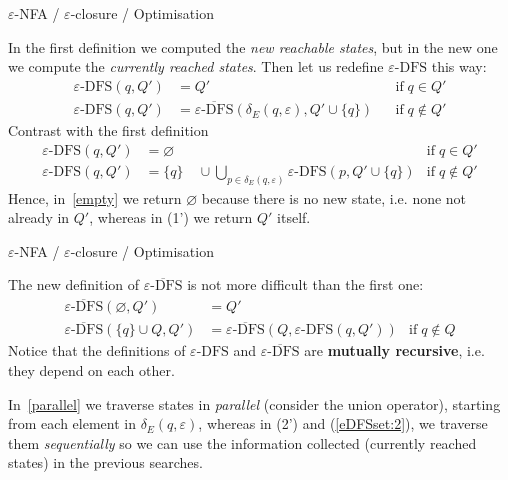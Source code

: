 \documentclass[compress,dvips,xcolor={dvipsnames},t]{beamer}
\newcommand\eNFA{\(\varepsilon\)-NFA\xspace}
\newcommand\eDFS{\varepsilon\text{-DFS}}
\newcommand\eDFSset{\overline{\varepsilon\text{-DFS}}}
\begin{document}
%
\begin{frame}{\eNFA{} / \(\varepsilon\)-closure / Optimisation}

In the first definition we computed the \emph{new reachable states},
but in the new one we compute the \emph{currently reached
  states}. Then let us redefine \(\eDFS\) this way:
\begin{align*}
  \eDFS (q, Q')
&= Q'
&& \text{if} \; q \in Q' \tag{1'}\\
  \eDFS (q, Q')
&= \eDFSset (\delta_E (q, \varepsilon), Q' \cup \{q\})
&& \text{if} \; q \not\in Q' \tag{2'}
\end{align*}
Contrast with the first definition
\begin{align*}
   \eDFS (q, Q')
&= \varnothing
& \text{if} \; q \in Q' \tag{1} \label{empty}\\
  \eDFS (q, Q')
&= \{q\} \quad \cup \bigcup_{p \in \delta_E(q,\varepsilon)}{\eDFS (p, Q'
    \cup \{q\})}
& \text{if} \; q \not\in Q' \tag{2} \label{parallel}
\end{align*}
Hence, in~\eqref{empty} we return \(\varnothing\) because there is no
new state, i.e. none not already in \(Q'\), whereas in (1') we return
\(Q'\) itself.

\end{frame}

%
\begin{frame}{\eNFA{} / \(\varepsilon\)-closure / Optimisation}

The new definition of \(\eDFSset\) is not more difficult than the
first one:
\begin{align}
   \eDFSset (\varnothing, Q')
&= Q'\label{eDFSset:1}\\
   \eDFSset (\{q\} \cup Q, Q')
&= \eDFSset (Q, \eDFS (q, Q'))
& \text{if} \; q \not\in Q \label{eDFSset:2}
\end{align}
Notice that the definitions of \(\eDFS\) and \(\eDFSset\) are
\textbf{mutually recursive}, i.e. they depend on each other.

\bigskip

In~\eqref{parallel} we traverse states in \emph{parallel} (consider
the union operator), starting from each element in \(\delta_E (q,
\varepsilon)\), whereas in (2') and (\ref{eDFSset:2}), we traverse them
\emph{sequentially} so we can use the information collected (currently
reached states) in the previous searches.

\end{frame}
\end{document}
